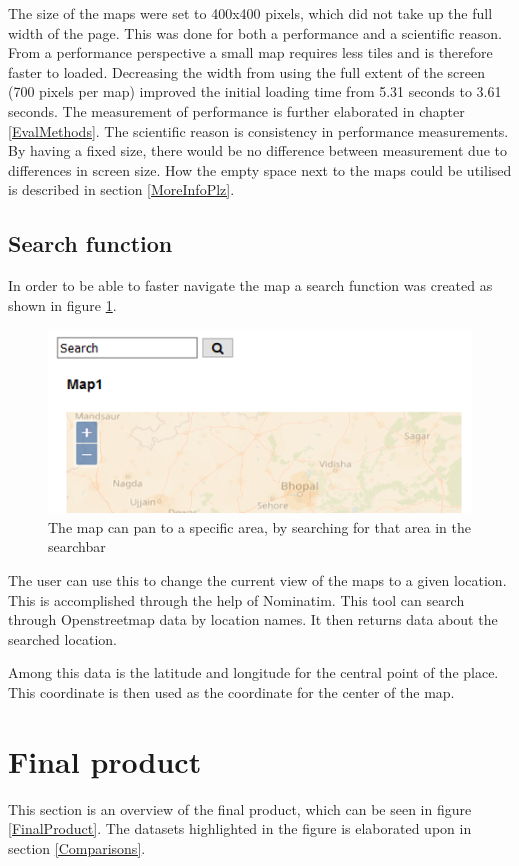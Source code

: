 The size of the maps were set to 400x400 pixels, which did not take up the full width of the page. This was done for both a performance and a scientific reason. From a performance perspective a small map requires less tiles and is therefore faster to loaded. Decreasing the width from using the full extent of the screen (700 pixels per map) improved the initial loading time from 5.31 seconds to 3.61 seconds. The measurement of performance is further elaborated in chapter \ref{EvalMethods}. 
The scientific reason is consistency in performance measurements. By having a fixed size, there would be no difference between measurement due to differences in screen size. How the empty space next to the maps could be utilised is described in section \ref{MoreInfoPlz}.  
 

\subsection{Search function}
In order to be able to faster navigate the map a search function was created as shown in figure \ref{SearchBar}. 

\begin{figure} [H]
	\centering
	\includegraphics[width=.6\textwidth]{Pictures/SearchBar}
	\caption{The map can pan to a specific area, by searching for that area in the searchbar}
	\label{SearchBar}
\end{figure}

The user can use this to change the current view of the maps to a given location. This is accomplished through the help of Nominatim. This tool can search through Openstreetmap data by location names. It then returns data about the searched location. 

Among this data is the latitude and longitude for the central point of the place. \citep{Nominatim}
This coordinate is then used as the coordinate for the center of the map.

\section{Final product}

This section is an overview of the final product, which can be seen in figure \ref{FinalProduct}. 
The datasets highlighted in the figure is elaborated upon in section \ref{Comparisons}.


